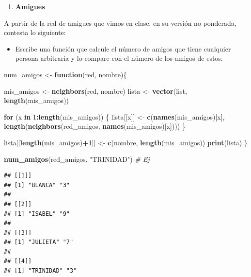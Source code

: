 \documentclass[
]{article}
\newenvironment{Shaded}{\begin{snugshade}}{\end{snugshade}}
\newcommand{\CommentTok}[1]{\textcolor[rgb]{0.56,0.35,0.01}{\textit{#1}}}
\newcommand{\ControlFlowTok}[1]{\textcolor[rgb]{0.13,0.29,0.53}{\textbf{#1}}}
\newcommand{\DecValTok}[1]{\textcolor[rgb]{0.00,0.00,0.81}{#1}}
\newcommand{\FunctionTok}[1]{\textcolor[rgb]{0.13,0.29,0.53}{\textbf{#1}}}
\newcommand{\NormalTok}[1]{#1}
\newcommand{\OtherTok}[1]{\textcolor[rgb]{0.56,0.35,0.01}{#1}}
\newcommand{\SpecialCharTok}[1]{\textcolor[rgb]{0.81,0.36,0.00}{\textbf{#1}}}
\newcommand{\StringTok}[1]{\textcolor[rgb]{0.31,0.60,0.02}{#1}}
\providecommand{\tightlist}{%
  \setlength{\itemsep}{0pt}\setlength{\parskip}{0pt}}
\begin{document}
\begin{enumerate}
\def\labelenumi{\arabic{enumi}.}
\setcounter{enumi}{1}
\tightlist
\item
  \textbf{Amigues}
\end{enumerate}

A partir de la red de amigues que vimos en clase, en su versión no
ponderada, contesta lo siguiente:

\begin{itemize}
\tightlist
\item
  Escribe una función que calcule el número de amigos que tiene
  cualquier persona arbitraria y lo compare con el número de los amigos
  de estos.
\end{itemize}

\begin{Shaded}
\begin{Highlighting}[]
\NormalTok{num\_amigos }\OtherTok{\textless{}{-}} \ControlFlowTok{function}\NormalTok{(red, nombre)\{}
  
\NormalTok{  mis\_amigos }\OtherTok{\textless{}{-}} \FunctionTok{neighbors}\NormalTok{(red, nombre)}
\NormalTok{  lista }\OtherTok{\textless{}{-}} \FunctionTok{vector}\NormalTok{(}\StringTok{\textquotesingle{}list\textquotesingle{}}\NormalTok{, }\FunctionTok{length}\NormalTok{(mis\_amigos))}
  
  \ControlFlowTok{for}\NormalTok{ (x }\ControlFlowTok{in} \DecValTok{1}\SpecialCharTok{:}\FunctionTok{length}\NormalTok{(mis\_amigos)) \{}
\NormalTok{    lista[[x]] }\OtherTok{\textless{}{-}} \FunctionTok{c}\NormalTok{(}\FunctionTok{names}\NormalTok{(mis\_amigos)[x], }\FunctionTok{length}\NormalTok{(}\FunctionTok{neighbors}\NormalTok{(red\_amigos, }\FunctionTok{names}\NormalTok{(mis\_amigos)[x])))}
\NormalTok{  \}}
  
\NormalTok{  lista[[}\FunctionTok{length}\NormalTok{(mis\_amigos)}\SpecialCharTok{+}\DecValTok{1}\NormalTok{]] }\OtherTok{\textless{}{-}} \FunctionTok{c}\NormalTok{(nombre, }\FunctionTok{length}\NormalTok{(mis\_amigos))}
  \FunctionTok{print}\NormalTok{(lista)}
\NormalTok{\}}

\FunctionTok{num\_amigos}\NormalTok{(red\_amigos, }\StringTok{"TRINIDAD"}\NormalTok{) }\CommentTok{\# Ej}
\end{Highlighting}
\end{Shaded}

\begin{verbatim}
## [[1]]
## [1] "BLANCA" "3"     
## 
## [[2]]
## [1] "ISABEL" "9"     
## 
## [[3]]
## [1] "JULIETA" "7"      
## 
## [[4]]
## [1] "TRINIDAD" "3"
\end{verbatim}
\end{document}
